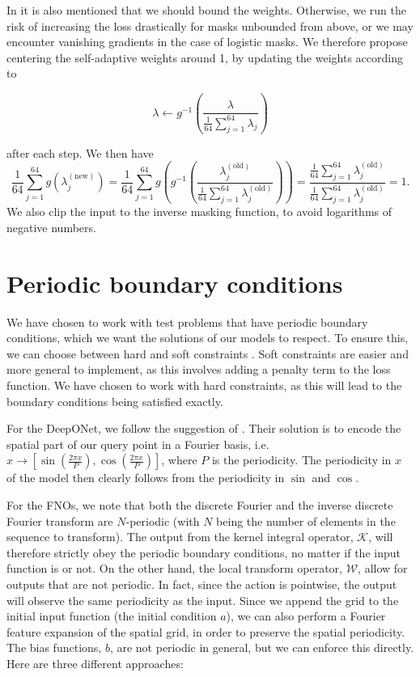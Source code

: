 In \cite{mcclennySelfAdaptivePhysicsInformedNeural2023a} it is also mentioned that we should bound the weights.
Otherwise, we run the risk of increasing the loss drastically for masks unbounded from above, or we may encounter vanishing gradients in the case of logistic masks.
We therefore propose centering the self-adaptive weights around 1, by updating the weights according to

\begin{equation}
    \lambda \leftarrow g^{-1}\left(\frac{\lambda}{\frac{1}{64} \sum_{j=1}^{64} \lambda_j}\right)
\end{equation}

after each step. We then have 
\[
\frac{1}{64}\sum_{j=1}^{64} g\left(\lambda_j^{(\text{new})}\right) 
=
\frac{1}{64}\sum_{j=1}^{64} g
\left(g^{-1}
\left(\frac{\lambda_j^{(\text{old})}}{\frac{1}{64} \sum_{j=1}^{64} \lambda_j^{(\text{old})}}
\right)\right)
=
\frac{\frac{1}{64} \sum_{j=1}^{64} \lambda_j^{(\text{old})}}{\frac{1}{64} \sum_{j=1}^{64} \lambda_j^{(\text{old})}}
=
1.
\]
We also clip the input to the inverse masking function, to avoid logarithms of negative numbers.

\section{Periodic boundary conditions}

We have chosen to work with test problems that have periodic boundary conditions, which we want the solutions of our models to respect.
To ensure this, we can choose between hard and soft constraints . Soft constraints are easier and more general 
to implement, as this involves adding a penalty term to the loss function. We have chosen to work with hard constraints,
as this will lead to the boundary conditions being satisfied exactly.

For the DeepONet, we follow the suggestion of . Their solution is to encode the spatial 
part of our query point in a Fourier basis, i.e. \(x \to \left[\sin(\frac{2\pi x}{P}), \cos(\frac{2\pi x}{P})\right]\), where \(P\) is the periodicity.
The periodicity in \(x\) of the model then clearly follows from the periodicity in \(\sin\) and \(\cos\).

For the FNOs, we note that both the discrete Fourier and the inverse discrete Fourier transform are \(N\)-periodic (with \(N\) being the number of
elements in the sequence to transform). 
The output from the kernel integral operator, \(\mathcal{K}\), will therefore strictly obey the periodic boundary conditions, no matter if the input function is or not.
On the other hand, the local transform operator, \(\mathcal{W}\), allow for outputs that are not periodic.
In fact, since the action is pointwise, the output will observe the same periodicity as the input.
Since we append the grid to the initial input function (the initial condition \(a\)), we can also perform a Fourier feature expansion of the spatial grid, in order to preserve the spatial periodicity.
The bias functions, \(b\), are not periodic in general, but we can enforce this directly. Here are three different approaches:

